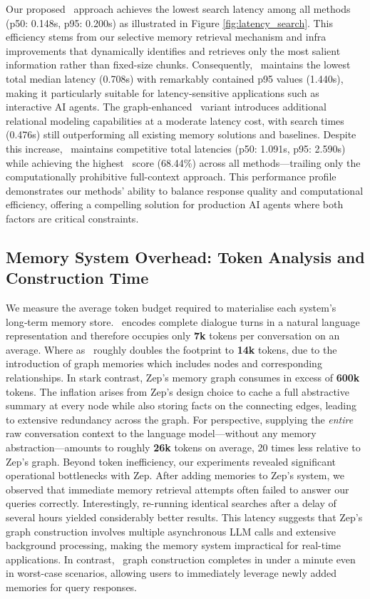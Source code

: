 Our proposed \mem~approach achieves the lowest search latency among all methods (p50: 0.148s, p95: 0.200s) as illustrated in Figure \ref{fig:latency_search}. This efficiency stems from our selective memory retrieval mechanism and infra improvements that dynamically identifies and retrieves only the most salient information rather than fixed-size chunks. Consequently, \mem~maintains the lowest total median latency (0.708s) with remarkably contained p95 values (1.440s), making it particularly suitable for latency-sensitive applications such as interactive AI agents. The graph-enhanced \memp~variant introduces additional relational modeling capabilities at a moderate latency cost, with search times (0.476s) still outperforming all existing memory solutions and baselines. 
Despite this increase, \memp~maintains competitive total latencies (p50: 1.091s, p95: 2.590s) while achieving the highest \Judge~score (68.44\%) across all methods—trailing only the computationally prohibitive full-context approach.
This performance profile demonstrates our methods' ability to balance response quality and computational efficiency, offering a compelling solution for production AI agents where both factors are critical constraints.


\subsection{Memory System Overhead: Token Analysis and Construction Time}
We measure the average token budget required to materialise each system's long‑term memory store.
\mem~encodes complete dialogue turns in a natural language representation and therefore occupies only \textbf{7k} tokens per conversation on an average. Where as \memp~roughly doubles the footprint to \textbf{14k} tokens, due to the introduction of graph memories which includes nodes and corresponding relationships. In stark contrast, Zep's memory graph consumes in excess of \textbf{600k} tokens. The inflation arises from Zep's design choice to cache a full abstractive summary at every node while also storing facts on the connecting edges, leading to extensive redundancy across the graph. For perspective, supplying the \emph{entire} raw conversation context to the language model—without any memory abstraction—amounts to roughly \textbf{26k} tokens on average, 20 times less relative to Zep's graph.
Beyond token inefficiency, our experiments revealed significant operational bottlenecks with Zep. After adding memories to Zep's system, we observed that immediate memory retrieval attempts often failed to answer our queries correctly. Interestingly, re-running identical searches after a delay of several hours yielded considerably better results. This latency suggests that Zep's graph construction involves multiple asynchronous LLM calls and extensive background processing, making the memory system impractical for real-time applications. In contrast, \mem~graph construction completes in under a minute even in worst-case scenarios, allowing users to immediately leverage newly added memories for query responses.

